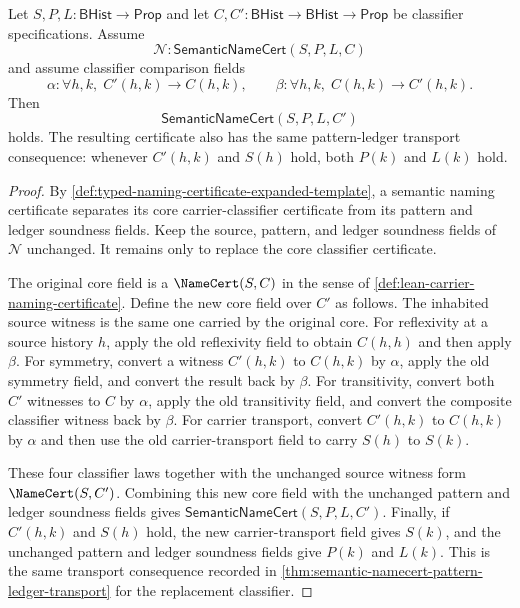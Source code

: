 \begin{theorem}
\label{thm:semantic-namecert-classifier-replacement}
Let $S,P,L:\mathsf{BHist}\to\mathsf{Prop}$ and let
$C,C':\mathsf{BHist}\to\mathsf{BHist}\to\mathsf{Prop}$ be classifier specifications. Assume
$$
\mathcal{N}:\mathsf{SemanticNameCert}(S,P,L,C)
$$
and assume classifier comparison fields
$$
\alpha:\forall h,k,\; C'(h,k)\to C(h,k),
\qquad
\beta:\forall h,k,\; C(h,k)\to C'(h,k).
$$
Then
$$
\mathsf{SemanticNameCert}(S,P,L,C')
$$
holds. The resulting certificate also has the same pattern-ledger transport consequence: whenever $C'(h,k)$ and $S(h)$ hold, both $P(k)$ and $L(k)$ hold.
\end{theorem}
\begin{proof}
By \autoref{def:typed-naming-certificate-expanded-template}, a semantic naming certificate separates its core carrier-classifier certificate from its pattern and ledger soundness fields. Keep the source, pattern, and ledger soundness fields of $\mathcal{N}$ unchanged. It remains only to replace the core classifier certificate.

The original core field is a $\NameCert(S,C)$ in the sense of \autoref{def:lean-carrier-naming-certificate}. Define the new core field over $C'$ as follows. The inhabited source witness is the same one carried by the original core. For reflexivity at a source history $h$, apply the old reflexivity field to obtain $C(h,h)$ and then apply $\beta$. For symmetry, convert a witness $C'(h,k)$ to $C(h,k)$ by $\alpha$, apply the old symmetry field, and convert the result back by $\beta$. For transitivity, convert both $C'$ witnesses to $C$ by $\alpha$, apply the old transitivity field, and convert the composite classifier witness back by $\beta$. For carrier transport, convert $C'(h,k)$ to $C(h,k)$ by $\alpha$ and then use the old carrier-transport field to carry $S(h)$ to $S(k)$.

These four classifier laws together with the unchanged source witness form $\NameCert(S,C')$. Combining this new core field with the unchanged pattern and ledger soundness fields gives $\mathsf{SemanticNameCert}(S,P,L,C')$. Finally, if $C'(h,k)$ and $S(h)$ hold, the new carrier-transport field gives $S(k)$, and the unchanged pattern and ledger soundness fields give $P(k)$ and $L(k)$. This is the same transport consequence recorded in \autoref{thm:semantic-namecert-pattern-ledger-transport} for the replacement classifier.
\end{proof}
